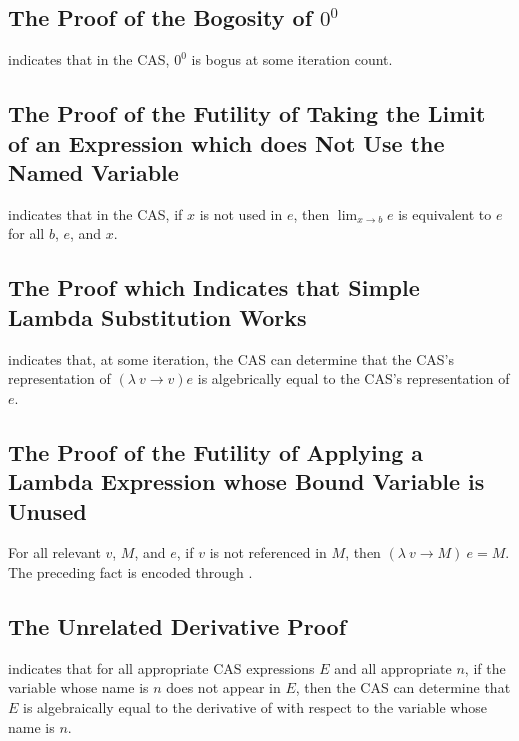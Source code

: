 \documentclass{report}
\begin{document}
\subsection{The Proof of the Bogosity of \(0^0\)}
  indicates that in the  CAS, \(0^0\) is bogus at some iteration count.

\subsection{The Proof of the Futility of Taking the Limit of an Expression which does Not Use the Named Variable}
  indicates that in the  CAS, if \(x\) is not used in \(e\), then \(\lim_{x \rightarrow b} e\) is equivalent to \(e\) for all \(b\), \(e\), and \(x\).

\subsection{The Proof which Indicates that Simple Lambda Substitution Works}
  indicates that, at some iteration, the  CAS can determine that the  CAS's representation of \(\left(\lambda\ v \rightarrow v\right) e\) is algebrically equal to the  CAS's representation of \(e\).

\subsection{The Proof of the Futility of Applying a Lambda Expression whose Bound Variable is Unused}
For all relevant \(v\), \(M\), and \(e\), if \(v\) is not referenced in \(M\), then \(\left(\lambda\ v \rightarrow M\right)\ e = M\).  The preceding fact is encoded through .

\subsection{The Unrelated Derivative Proof}
  indicates that for all appropriate  CAS expressions \(E\) and all appropriate \(n\), if the variable whose name is \(n\) does not appear in \(E\), then the  CAS can determine that \(E\) is algebraically equal to the derivative of  with respect to the variable whose name is \(n\).
\end{document}
